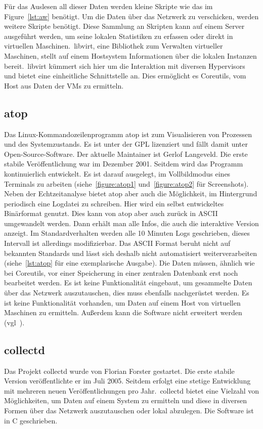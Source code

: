 Für das Auslesen all dieser Daten werden kleine Skripte wie das im
Figure~\ref{lst:aw} benötigt. Um die Daten über das Netzwerk zu verschicken,
werden weitere Skripte benötigt. Diese Sammlung an Skripten kann auf einem
Server ausgeführt werden, um seine lokalen Statistiken zu erfassen oder direkt
in virtuellen Maschinen.\ libvirt, eine Bibliothek zum Verwalten virtueller
Maschinen, stellt auf einem Hostsystem Informationen über die lokalen Instanzen
bereit.\ libvirt kümmert sich hier um die Interaktion mit diversen Hypervisors
und bietet eine einheitliche Schnittstelle an. Dies ermöglicht es Coreutils,
vom Host aus Daten der VMs zu ermitteln.
\tm%

\subsection{atop}
Das Linux-Kommandozeilenprogramm atop ist zum Visualisieren von Prozessen und
des Systemzustands. Es ist unter der GPL lizenziert und fällt damit unter
Open-Source-Software. Der aktuelle \gls{Maintainer} ist Gerlof Langeveld.  Die
erste stabile Veröffentlichung war im Dezember 2001. Seitdem wird das Programm
kontinuierlich entwickelt. Es ist darauf ausgelegt, im Vollbildmodus eines
Terminals zu arbeiten (siehe~\ref{figure:atop1} und~\ref{figure:atop2} für
Screenshots). Neben der Echtzeitanalyse bietet atop aber auch die Möglichkeit,
im Hintergrund periodisch eine Logdatei zu schreiben. Hier wird ein selbst
entwickeltes Binärformat genutzt. Dies kann von atop aber auch zurück in ASCII
umgewandelt werden. Dann erhält man alle Infos, die auch die interaktive
Version anzeigt. Im Standardverhalten werden alle 10 Minuten Logs geschrieben,
dieses Intervall ist allerdings modifizierbar. Das ASCII Format beruht nicht
auf bekannten Standards und lässt sich deshalb nicht automatisiert
weiterverarbeiten (siehe~\ref{lst:atop} für eine exemplarische Ausgabe). Die
Daten müssen, ähnlich wie bei Coreutils, vor einer Speicherung in einer
zentralen Datenbank erst noch bearbeitet werden. Es ist keine Funktionalität
eingebaut, um gesammelte Daten über das Netzwerk auszutauschen, dies muss
ebenfalls nachgerüstet werden. Es ist keine Funktionalität vorhanden, um Daten
auf einem Host von virtuellen Maschinen zu ermitteln. Außerdem kann die
Software nicht erweitert werden (vgl~\cite{atop}).
\tm%

\subsection{collectd}
Das Projekt collectd wurde von Florian Forster gestartet. Die erste stabile
Version veröffentlichte er im Juli 2005. Seitdem erfolgt eine stetige
Entwicklung mit mehreren neuen Veröffentlichungen pro Jahr.\ collectd bietet
eine Vielzahl von Möglichkeiten, um Daten auf einem System zu ermitteln und
diese in diversen Formen über das Netzwerk auszutauschen oder lokal abzulegen.
Die Software ist in C geschrieben.

